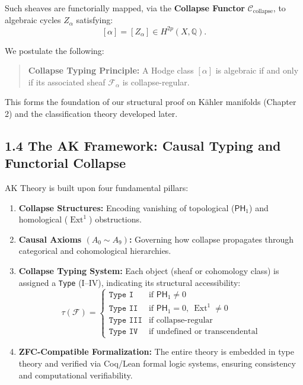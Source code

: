 \documentclass[11pt]{article}
\begin{document}
Such sheaves are functorially mapped, via the \textbf{Collapse Functor} $\mathcal{C}_{\text{collapse}}$, to algebraic cycles $Z_\alpha$ satisfying:
\[
[\alpha] = [Z_\alpha] \in H^{2p}(X, \mathbb{Q}).
\]

We postulate the following:

\begin{quote}
\textbf{Collapse Typing Principle:}  
A Hodge class $[\alpha]$ is algebraic if and only if its associated sheaf $\mathcal{F}_\alpha$ is collapse-regular.
\end{quote}

This forms the foundation of our structural proof on Kähler manifolds (Chapter 2) and the classification theory developed later.

\subsection{1.4 The AK Framework: Causal Typing and Functorial Collapse}

AK Theory is built upon four fundamental pillars:

\begin{enumerate}
  \item \textbf{Collapse Structures:} Encoding vanishing of topological ($\mathsf{PH}_1$) and homological ($\operatorname{Ext}^1$) obstructions.
  \item \textbf{Causal Axioms $(A_0 \sim A_9)$:} Governing how collapse propagates through categorical and cohomological hierarchies.
  \item \textbf{Collapse Typing System:} Each object (sheaf or cohomology class) is assigned a \texttt{Type} (I–IV), indicating its structural accessibility:
    \[
    \tau(\mathcal{F}) =
    \begin{cases}
    \texttt{Type I} & \text{if } \mathsf{PH}_1 \ne 0 \\
    \texttt{Type II} & \text{if } \mathsf{PH}_1 = 0, \ \operatorname{Ext}^1 \ne 0 \\
    \texttt{Type III} & \text{if collapse-regular} \\
    \texttt{Type IV} & \text{if undefined or transcendental}
    \end{cases}
    \]
  \item \textbf{ZFC-Compatible Formalization:} The entire theory is embedded in type theory and verified via Coq/Lean formal logic systems, ensuring consistency and computational verifiability.
\end{enumerate}
\end{document}
